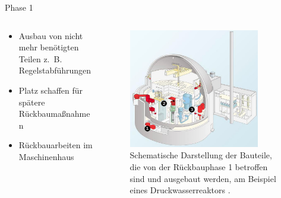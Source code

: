 \begin{frame}{Phase 1}
  \begin{columns}

    \begin{column}{0.48\textwidth}
      \begin{itemize}
        \setlength\itemsep{1.2em}
        \item{ Ausbau von nicht mehr benötigten Teilen z.\, B. Regelstabführungen }
        \item{ Platz schaffen für spätere Rückbaumaßnahmen}
        \item{ Rückbauarbeiten im Maschinenhaus}
      \end{itemize}
    \end{column}

    \begin{column}{0.48\textwidth}
      \begin{figure}
         \centering
         \includegraphics[width=0.85\textwidth]{./bilder/abbau_phase_1_spiegel.png}
         \caption{Schematische Darstellung der Bauteile, die von der Rückbauphase 1 betroffen sind und ausgebaut werden, am Beispiel eines Druckwasserreaktors \cite{abbau_grafik_stade}. }
         \label{ fig: phase_1 }
       \end{figure}
    \end{column}

  \end{columns}
\end{frame}



